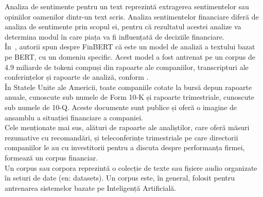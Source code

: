 Analiza de sentimente pentru un text reprezintă extragerea sentimentelor sau opiniilor oamenilor dintr-un text scris.
Analiza sentimentelor financiare diferă de analiza de sentimente prin scopul ei, pentru că rezultatul acestei analize va determina modul în care piața va fi influențată de deciziile financiare.\\
În~\cite{FinBERT1}, autorii spun despre FinBERT că este un model de analiză a textului bazat pe BERT, cu un domeniu specific. Acest model a fost antrenat pe un corpus de 4.9 miliarde de tokeni compuși din rapoarte ale companiilor, transcripturi ale conferințelor și rapoarte de analiză, conform \cite{FinBERT2}.\\

În Statele Unite ale Americii, toate companiile cotate la bursă depun rapoarte anuale, cunoscute sub numele de Form 10-K și rapoarte trimestriale, cunoscute sub numele de 10-Q. Aceste documente sunt publice și oferă o imagine de ansamblu a situației financiare a companiei.\\
Cele menționate mai sus, alături de rapoarte ale analiștilor, care oferă măsuri rezumative cu recomandări, și teleconferințe trimestriale pe care directorii companiilor le au cu investitorii pentru a discuta despre performanța firmei, formează un corpus financiar. \\
Un corpus sau corpora reprezintă o colecție de texte sau fișiere audio organizate în seturi de date (en: datasets). Un corpus este, în general, folosit pentru antrenarea sistemelor bazate pe Inteligență Artificială. 
